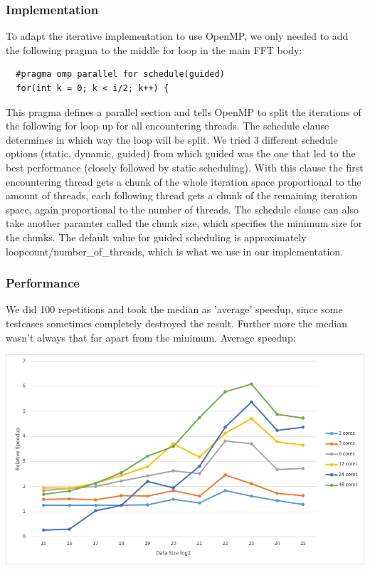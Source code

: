 \subsubsection{Implementation}

To adapt the iterative implementation to use OpenMP, we only needed to add the following pragma to the middle for loop in the main FFT body:

\begin{lstlisting}
  #pragma omp parallel for schedule(guided)
  for(int k = 0; k < i/2; k++) {
\end{lstlisting}

This pragma defines a parallel section and tells OpenMP to split the iterations of the following for loop up for all encountering threads. The schedule clause determines in which way the loop will be split.
We tried 3 different schedule options (static, dynamic, guided) from which guided was the one that led to the best performance (closely followed by static scheduling). With this clause the first encountering thread
gets a chunk of the whole iteration space proportional to the amount of threads, each following thread gets a chunk of the remaining iteration space, again proportional to the number of threads. The schedule clause can also take
another paramter called the chunk size, which specifies the minimum size for the chunks. The default value for guided scheduling is approximately loopcount/number\_of\_threads, which is what we use in our implementation.

\subsubsection{Performance}

We did 100 repetitions and took the median as 'average' speedup, since some testcases sometimes completely destroyed the result. Further more the median wasn't always that far apart from the minimum.\newline 
Average speedup:

\includegraphics[width=\textwidth]{omp_it_avg.png}

